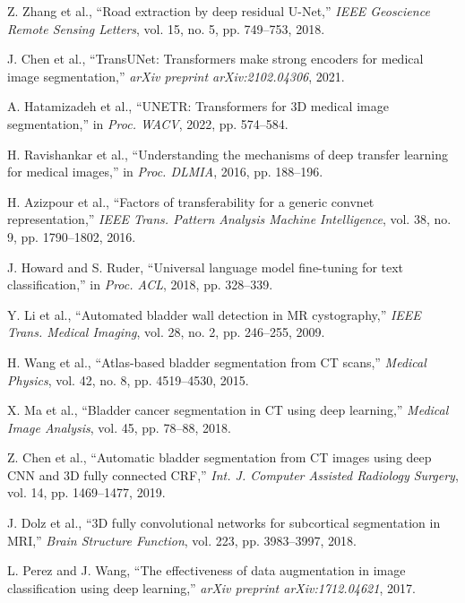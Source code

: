 \documentclass{article}
\begin{document}
\begin{thebibliography}{99}
Z. Zhang et al., ``Road extraction by deep residual U-Net,'' \textit{IEEE Geoscience Remote Sensing Letters}, vol. 15, no. 5, pp. 749--753, 2018.

J. Chen et al., ``TransUNet: Transformers make strong encoders for medical image segmentation,'' \textit{arXiv preprint arXiv:2102.04306}, 2021.

A. Hatamizadeh et al., ``UNETR: Transformers for 3D medical image segmentation,'' in \textit{Proc. WACV}, 2022, pp. 574--584.

H. Ravishankar et al., ``Understanding the mechanisms of deep transfer learning for medical images,'' in \textit{Proc. DLMIA}, 2016, pp. 188--196.

H. Azizpour et al., ``Factors of transferability for a generic convnet representation,'' \textit{IEEE Trans. Pattern Analysis Machine Intelligence}, vol. 38, no. 9, pp. 1790--1802, 2016.

J. Howard and S. Ruder, ``Universal language model fine-tuning for text classification,'' in \textit{Proc. ACL}, 2018, pp. 328--339.

Y. Li et al., ``Automated bladder wall detection in MR cystography,'' \textit{IEEE Trans. Medical Imaging}, vol. 28, no. 2, pp. 246--255, 2009.

H. Wang et al., ``Atlas-based bladder segmentation from CT scans,'' \textit{Medical Physics}, vol. 42, no. 8, pp. 4519--4530, 2015.

X. Ma et al., ``Bladder cancer segmentation in CT using deep learning,'' \textit{Medical Image Analysis}, vol. 45, pp. 78--88, 2018.

Z. Chen et al., ``Automatic bladder segmentation from CT images using deep CNN and 3D fully connected CRF,'' \textit{Int. J. Computer Assisted Radiology Surgery}, vol. 14, pp. 1469--1477, 2019.

J. Dolz et al., ``3D fully convolutional networks for subcortical segmentation in MRI,'' \textit{Brain Structure Function}, vol. 223, pp. 3983--3997, 2018.

L. Perez and J. Wang, ``The effectiveness of data augmentation in image classification using deep learning,'' \textit{arXiv preprint arXiv:1712.04621}, 2017.


\end{thebibliography}
\end{document}
